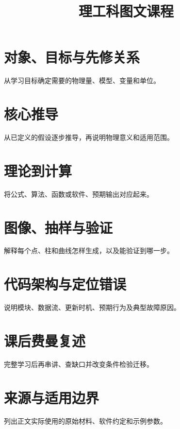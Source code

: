 \documentclass[UTF8,fontset=none,a4paper,11pt]{ctexart}
\title{理工科图文课程}
\author{}
\date{}
\begin{document}
\maketitle
\tableofcontents
\section{对象、目标与先修关系}
从学习目标确定需要的物理量、模型、变量和单位。
\section{核心推导}
从已定义的假设逐步推导，再说明物理意义和适用范围。
\section{理论到计算}
将公式、算法、函数或软件、预期输出对应起来。
\section{图像、抽样与验证}
解释每个点、柱和曲线怎样生成，以及能验证到哪一步。
\section{代码架构与定位错误}
说明模块、数据流、更新时机、预期行为及典型故障原因。
\section*{课后费曼复述}
完整学习后再串讲、查缺口并改变条件检验迁移。
\section*{来源与适用边界}
列出正文实际使用的原始材料、软件约定和示例参数。
\end{document}

